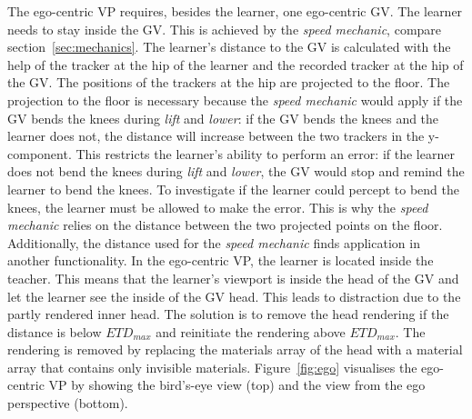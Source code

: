 The ego-centric VP requires, besides the learner, one ego-centric GV. The learner needs to stay inside the GV. This is achieved by the \textit{speed mechanic}, compare section~\ref{sec:mechanics}. The learner's distance to the GV is calculated with the help of the tracker at the hip of the learner and the recorded tracker at the hip of the GV. The positions of the trackers at the hip are projected to the floor. The projection to the floor is necessary because the \textit{speed mechanic} would apply if the GV bends the knees during \textit{lift} and \textit{lower}: if the GV bends the knees and the learner does not, the distance will increase between the two trackers in the y-component. This restricts the learner's ability to perform an error: if the learner does not bend the knees during \textit{lift} and \textit{lower}, the GV would stop and remind the learner to bend the knees. To investigate if the learner could percept to bend the knees, the learner must be allowed to make the error. This is why the \textit{speed mechanic} relies on the distance between the two projected points on the floor.\\
Additionally, the distance used for the \textit{speed mechanic} finds application in another functionality. In the ego-centric VP, the learner is located inside the teacher. This means that the learner's viewport is inside the head of the GV and let the learner see the inside of the GV head. This leads to distraction due to the partly rendered inner head. The solution is to remove the head rendering if the distance is below $ETD_{max}$ and reinitiate the rendering above $ETD_{max}$. The rendering is removed by replacing the materials array of the head with a material array that contains only invisible materials. Figure~\ref{fig:ego} visualises the ego-centric VP by showing the bird's-eye view (top) and the view from the ego perspective (bottom).\\

